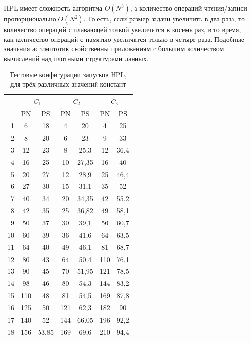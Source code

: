 	HPL имеет сложность алгоритма \(O(N^3)\), а количество операций чтения/записи пропорционально \(O(N^2)\). То есть, если размер задачи увеличить в два раза, то количество операций с плавающей точкой увеличится в восемь раз, в то время, как количество операций с памятью увеличится только в четыре раза. Подобные значения ассимптотик свойственны приложениям с большим количеством вычислений над плотными структурами данных.

	\begin{table}
		\begin{tabular}{|r||c|c||c|c||c|c|}
			\hline
			& \multicolumn{2}{c|}{\(C_1\)} & \multicolumn{2}{c|}{\(C_2\)} & \multicolumn{2}{c|}{\(C_3\)} \\ \hline
			\textnumero & PN & PS & PN & PS & PN & PS \\ \hline
			1 & 6 & 18 & 4 & 20 & 4 & 25 \\ \hline
			2 & 8 & 20 & 6 & 23 & 9 & 33 \\ \hline
			3 & 12 & 23 & 8 & 25,3 & 12 & 36,4 \\ \hline
			4 & 16 & 25 & 10 & 27,35 & 16 & 40 \\ \hline
			5 & 20 & 27 & 12 & 28,9 & 25 & 46,4 \\ \hline
			6 & 27 & 30 & 15 & 31,1 & 35 & 52 \\ \hline
			7 & 40 & 34 & 20 & 34,35 & 42 & 55,2 \\ \hline
			8 & 42 & 35 & 25 & 36,82 & 49 & 58,1 \\ \hline
			9 & 50 & 37 & 30 & 39,1 & 56 & 60,7 \\ \hline
			10 & 60 & 39 & 36 & 41,6 & 64 & 63,5 \\ \hline
			11 & 64 & 40 & 49 & 46,1 & 81 & 68,7 \\ \hline
			12 & 80 & 43 & 64 & 50,4 & 110 & 76,1 \\ \hline
			13 & 90 & 45 & 70 & 51,95 & 121 & 78,5 \\ \hline
			14 & 98 & 46 & 80 & 54,3 & 144 & 83,2 \\ \hline
			15 & 110 & 48 & 81 & 54,5 & 169 & 87,8 \\ \hline
			16 & 125 & 50 & 121 & 62,3 & 182 & 90 \\ \hline
			17 & 140 & 52 & 144 & 66,05 & 196 & 92,2 \\ \hline
			18 & 156 & 53,85 & 169 & 69,6 & 210 & 94,4 \\ \hline
		\end{tabular}
		\caption{Тестовые конфигурации запусков HPL, для трёх различных значений констант}
		\label{test_HPL}
	\end{table}

